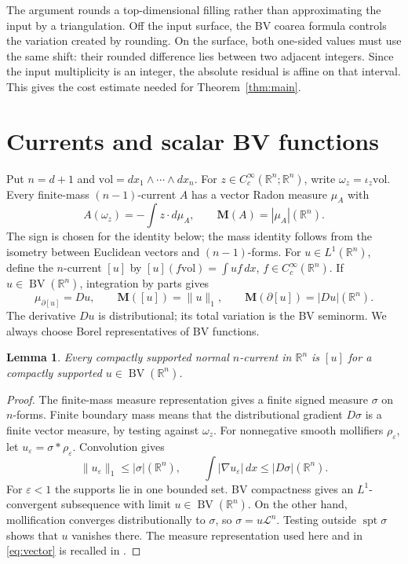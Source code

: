 \documentclass[11pt]{article}
\newtheorem{lemma}[theorem]{Lemma}
\newcommand{\R}{\mathbb R}
\newcommand{\M}{\mathbf M}
\newcommand{\LL}{\mathcal L}
\newcommand{\spt}{\operatorname{spt}}
\newcommand{\BV}{\operatorname{BV}}
\newcommand{\vol}{\mathrm{vol}}
\begin{document}
The argument rounds a top-dimensional filling rather than approximating the
input by a triangulation. Off the input surface, the BV coarea formula controls
the variation created by rounding. On the surface, both one-sided values must
use the same shift: their rounded difference lies between two adjacent
integers. Since the input multiplicity is an integer, the absolute residual
is affine on that interval. This gives the cost estimate needed for
Theorem~\ref{thm:main}.

\section{Currents and scalar BV functions}
Put $n=d+1$ and $\vol=dx_1\wedge\cdots\wedge dx_n$.
For $z\in C_c^\infty(\R^n;\R^n)$, write $\omega_z=\iota_z\vol$.
Every finite-mass $(n-1)$-current $A$ has a vector Radon measure $\mu_A$ with
\begin{equation}\label{eq:vector}
A(\omega_z)=-\int z\cdot d\mu_A,\qquad
\M(A)=|\mu_A|(\R^n).
\end{equation}
The sign is chosen for the identity below; the mass identity follows from
the isometry between Euclidean vectors and $(n-1)$-forms. For $u\in L^1(\R^n)$,
define the $n$-current $[u]$ by
$[u](f\vol)=\int uf\,dx$, $f\in C_c^\infty(\R^n)$.
If $u\in\BV(\R^n)$, integration by parts gives
\begin{equation}\label{eq:dictionary}
\mu_{\partial[u]}=Du,\qquad
\M([u])=\|u\|_1,\qquad
\M(\partial[u])=|Du|(\R^n).
\end{equation}
The derivative $Du$ is distributional; its total variation is the BV
seminorm. We always choose Borel representatives of BV functions.

\begin{lemma}\label{lem:top}
Every compactly supported normal $n$-current in $\R^n$ is $[u]$ for a
compactly supported $u\in\BV(\R^n)$.
\end{lemma}
\begin{proof}
The finite-mass measure representation gives a finite signed measure $\sigma$
on $n$-forms. Finite boundary mass means that the distributional gradient
$D\sigma$ is a finite vector measure, by testing against $\omega_z$.
For nonnegative smooth mollifiers $\rho_\varepsilon$, let
$u_\varepsilon=\sigma*\rho_\varepsilon$. Convolution gives
\[
\|u_\varepsilon\|_1\le|\sigma|(\R^n),\qquad
\int|\nabla u_\varepsilon|\,dx\le|D\sigma|(\R^n).
\]
For $\varepsilon<1$ the supports lie in one bounded set. BV compactness
\cite[slides 29--33]{Lahti} gives an $L^1$-convergent subsequence with limit
$u\in\BV(\R^n)$. On the other hand, mollification converges distributionally
to $\sigma$, so $\sigma=u\LL^n$. Testing outside $\spt\sigma$ shows that $u$
vanishes there. The measure representation used here and in
\eqref{eq:vector} is recalled in \cite[slides 15--17]{Lahti}.
\end{proof}
\end{document}
